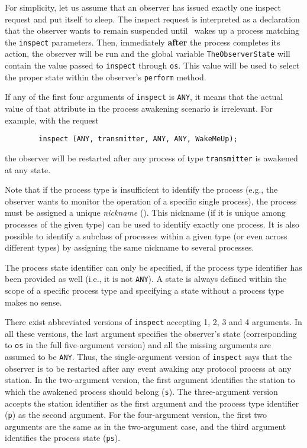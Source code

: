 For simplicity, let us assume that an observer has issued exactly
one inspect request and put itself to sleep.
The inspect request is interpreted as a declaration that the observer
wants to remain suspended until \smurph\ wakes up a
process matching the {\tt inspect} parameters.
Then, immediately {\bf after} the process completes its action, the
observer will be run and the global
variable {\tt TheObserverState} will contain the value passed to
{\tt inspect} through {\tt os}.
This value will be used to select the proper state within the
observer's {\tt perform} method.

If any of the first four arguments of {\tt inspect} is {\tt ANY},
it means that the actual value of that attribute in the process
awakening scenario is irrelevant.
For example, with the request
\begin{verbatim}
        inspect (ANY, transmitter, ANY, ANY, WakeMeUp);
\end{verbatim}
the observer will be restarted after any process of type {\tt transmitter}
is awakened at any state.

Note that if the process type is insufficient to identify the process (e.g.,
the observer wants to monitor the operation of a specific single process),
the process must be assigned a unique {\em nickname} ().
This nickname (if it is unique among processes of the given type) can
be used to identify exactly one process.
It is also possible to identify a subclass of processes within a given
type (or even across different types) by assigning the same nickname to
several processes.

The process state identifier can only be specified, if the process type
identifier has been provided as well (i.e., it is not {\tt ANY}).
A state is always defined within the scope of a specific process type and
specifying a state without a process type makes no sense.

There exist abbreviated versions of {\tt inspect}
accepting 1, 2, 3 and 4 arguments.
In all these versions, the last argument
specifies the observer's state
(corresponding to {\tt os} in the full five-argument version) and all the
missing arguments are assumed to be {\tt ANY}.
Thus, the single-argument version of {\tt inspect} says that the observer
is to be restarted after any event awaking any protocol process at any
station.
In the two-argument version, the first argument identifies the station to
which the awakened process should belong ({\tt s}).
The three-argument version accepts the station identifier as the first
argument and the process type identifier ({\tt p}) as the second argument.
For the four-argument version, the first two arguments are the same
as in the two-argument case, and the third argument identifies the process
state ({\tt ps}).

